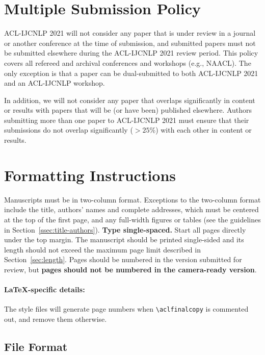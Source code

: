 \documentclass[11pt,a4paper]{article}
\begin{document}
\section{Multiple Submission Policy}

ACL-IJCNLP 2021 will not consider any paper that is under review in a journal or another conference at the time of submission, and submitted papers must not be submitted elsewhere during the ACL-IJCNLP 2021 review period. This policy covers all refereed and archival conferences and workshops (e.g., NAACL). The only exception is that a paper can be dual-submitted to both ACL-IJCNLP 2021 and an ACL-IJCNLP workshop. 

In addition, we will not consider any paper that overlaps significantly in content or results with papers that will be (or have been) published elsewhere. 
Authors submitting more than one paper to ACL-IJCNLP 2021 must ensure that their submissions do not overlap significantly ($>25$\%) with each other in content or results.

\section{Formatting Instructions}

Manuscripts must be in two-column format.
Exceptions to the two-column format include the title, authors' names and complete addresses, which must be centered at the top of the first page, and any full-width figures or tables (see the guidelines in Section~\ref{ssec:title-authors}).
\textbf{Type single-spaced.}
Start all pages directly under the top margin.
The manuscript should be printed single-sided and its length should not exceed the maximum page limit described in Section~\ref{sec:length}.
Pages should be numbered in the version submitted for review, but \textbf{pages should not be numbered in the camera-ready version}.

\paragraph{\LaTeX-specific details:}
The style files will generate page numbers when {\small\verb|\aclfinalcopy|} is commented out, and remove them otherwise.


\subsection{File Format}
\label{sect:pdf}
\end{document}
